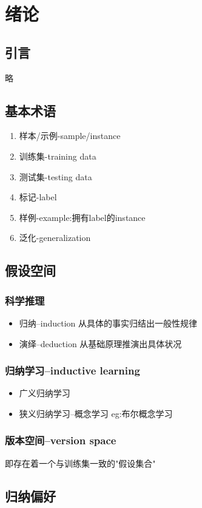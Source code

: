 \section{绪论}
\subsection{引言}
略
\subsection{基本术语}
\begin{enumerate}[label=(\roman*)]
    \item 样本/示例-sample/instance
    \item 训练集-training data
    \item 测试集-testing data
    \item 标记-label 
    \item 样例-example:拥有label的instance
    \item 泛化-generalization
\end{enumerate}
\subsection{假设空间}
\subsubsection{科学推理}
\begin{itemize}
    \item 归纳--induction
    从具体的事实归结出一般性规律
    \item 演绎--deduction
    从基础原理推演出具体状况
\end{itemize}
\subsubsection{归纳学习--inductive learning}
\begin{itemize}
    \item 广义归纳学习
    \item 狭义归纳学习--概念学习
    eg:布尔概念学习
\end{itemize}
\subsubsection{版本空间--version space}
即存在着一个与训练集一致的"假设集合"
\subsection{归纳偏好}




